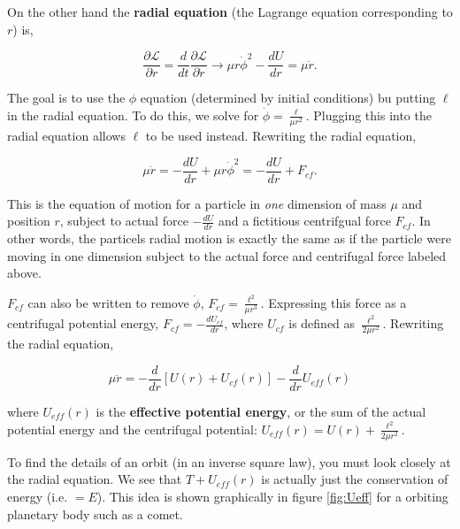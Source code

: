 On the other hand the {\bfseries radial equation} (the Lagrange equation corresponding to $r$) is,

\begin{equation*}
    \frac{\partial \mathcal{L}}{\partial r} = \frac{d}{dt} \frac{\partial \mathcal{L}}{\partial \dot{r}} \rightarrow \mu r \dot{\phi}^2 - \frac{dU}{dr} = \mu \ddot{r}.
\end{equation*}

The goal is to use the $\phi$ equation (determined by initial conditions) bu putting $\ell$ in the radial equation. To do this, we solve for $\dot{\phi} = \frac{\ell}{\mu r^2}$. Plugging this into the radial equation allows $\ell$ to be used instead. Rewriting the radial equation,

\begin{equation*}
    \mu \ddot{r} = - \frac{dU}{dr} + \mu r \dot{\phi}^2 = - \frac{dU}{dr} + F_{cf}.
\end{equation*}

This is the equation of motion for a particle in {\itshape one} dimension of mass $\mu$ and position $r$, subject to actual force $-\frac{dU}{dr}$ and a fictitious centrifgual force $F_{cf}$. In other words, the particels radial motion is exactly the same as if the particle were moving in one dimension subject to the actual force and centrifugal force labeled above. 

$F_{cf}$ can also be written to remove $\dot{\phi}$, $F_{cf} = \frac{\ell^2}{\mu r^3}$. Expressing this force as a centrifugal potential energy, $F_{cf} = -\frac{dU_{cf}}{dr}$, where $U_{cf}$ is defined as $\frac{\ell^2}{2 \mu r^2}$. Rewriting the radial equation,

\begin{equation*}
    \mu \ddot{r} = -\frac{d}{dr}[U(r) + U_{cf}(r)] - \frac{d}{dr} U_{eff}(r)
\end{equation*}

\noindent where $U_{eff}(r)$ is the {\bfseries effective potential energy}, or the sum of the actual potential energy and the centrifugal potential: $U_{eff}(r) = U(r) + \frac{\ell^2}{2 \mu r^2}$.

To find the details of an orbit (in an inverse square law), you must look closely at the radial equation. We see that $T + U_{eff}(r)$ is actually just the conservation of energy (i.e. $=E$). This idea is shown graphically in figure \ref{fig:Ueff} for a orbiting planetary body such as a comet.



